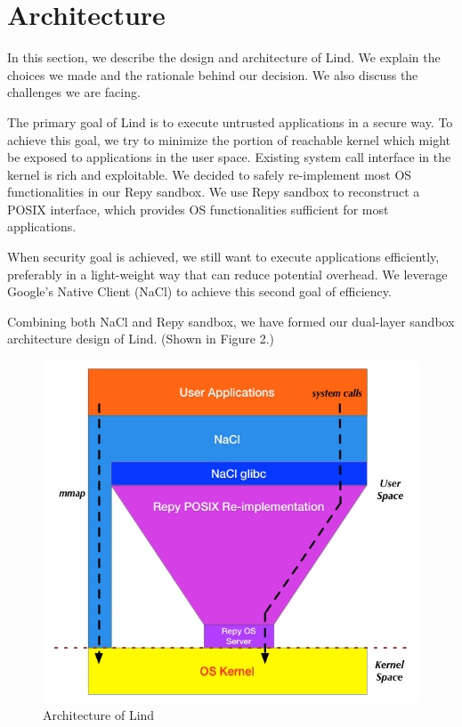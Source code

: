 \section{Architecture}
\label{sec.architecture}


In this section, we describe the design and architecture of Lind. We explain the choices we made 
and the rationale behind our decision. We also discuss the challenges we are facing.

The primary goal of Lind is to execute untrusted applications in a secure way. To achieve this goal, 
we try to minimize the portion of reachable kernel which might be exposed to applications in the user space. 
Existing system call interface in the kernel is rich and exploitable. We decided to safely re-implement most OS
functionalities in our Repy sandbox. We use Repy sandbox to reconstruct a POSIX interface, which provides 
OS functionalities sufficient for most applications. 
   
When security goal is achieved, we still want to execute applications efficiently, preferably in a light-weight 
way that can reduce potential overhead. We leverage Google's Native Client (NaCl) to achieve
this second goal of efficiency.  

Combining both NaCl and Repy sandbox, we have formed our dual-layer sandbox architecture 
design of Lind. (Shown in Figure 2.)  


\begin{figure}[h]
\centering
\includegraphics[width=1.0\columnwidth]{diagram/lind_architecture.png}
\caption{Architecture of Lind}
\label{fig:arch}
\end{figure}


